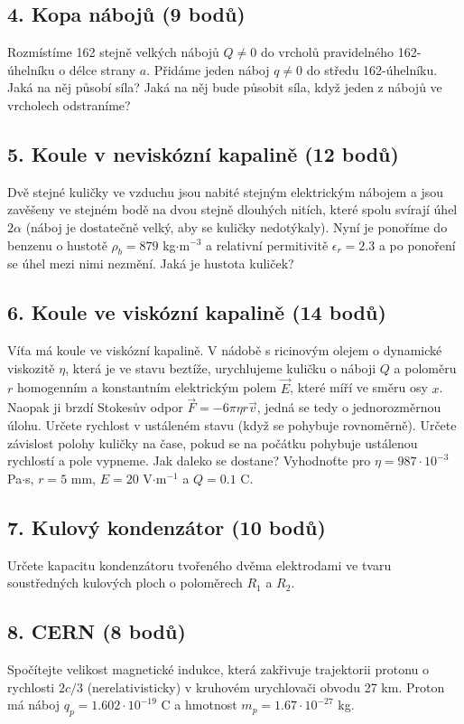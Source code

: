 \documentclass[12pt,a4paper]{article}
\begin{document}
\subsection*{4. Kopa nábojů (9 bodů)}
Rozmístíme 162 stejně velkých nábojů $Q\neq 0$ do vrcholů pravidelného 162-úhelníku o délce strany $a$. Přidáme jeden náboj $q\neq 0$ do středu 162-úhelníku. Jaká na něj působí síla? Jaká na něj bude působit síla, když jeden z nábojů ve vrcholech odstraníme?

\subsection*{5. Koule v neviskózní kapalině (12 bodů)}
Dvě stejné kuličky ve vzduchu jsou nabité stejným elektrickým nábojem a jsou zavěšeny ve stejném bodě na dvou stejně dlouhých nitích, které spolu svírají úhel $2\alpha$ (náboj je dostatečně velký, aby se kuličky nedotýkaly). Nyní je ponoříme do benzenu o hustotě $\rho_b = 879$ kg$\cdot$m$^{-3}$ a relativní permitivitě $\epsilon_r = 2.3$ a po ponoření se úhel mezi nimi nezmění. Jaká je hustota kuliček?

\subsection*{6. Koule ve viskózní kapalině (14 bodů)}
Víťa má koule ve viskózní kapalině. V nádobě s ricinovým olejem o dynamické viskozitě $\eta$, která je ve stavu beztíže, urychlujeme kuličku o náboji $Q$ a poloměru $r$ homogenním a konstantním elektrickým polem $\vec{E}$, které míří ve směru osy $x$. Naopak ji brzdí Stokesův odpor $\vec{F} = -6\pi\eta r\vec{v}$, jedná se tedy o jednorozměrnou úlohu. Určete rychlost v ustáleném stavu (když se pohybuje rovnoměrně). Určete závislost polohy kuličky na čase, pokud se na počátku pohybuje ustálenou rychlostí a pole vypneme. Jak daleko se dostane? Vyhodnoťte pro $\eta = 987\cdot 10^{-3}$ Pa$\cdot$s, $r = 5$ mm, $E = 20$ V$\cdot$m$^{-1}$ a $Q = 0.1$ C.

\subsection*{7. Kulový kondenzátor (10 bodů)}
Určete kapacitu kondenzátoru tvořeného dvěma elektrodami ve tvaru soustředných kulových ploch o poloměrech $R_1$ a $R_2$.

\subsection*{8. CERN (8 bodů)}
Spočítejte velikost magnetické indukce, která zakřivuje trajektorii protonu o rychlosti $2c/3$ (nerelativisticky) v kruhovém urychlovači obvodu 27 km. Proton má náboj $q_p = 1.602\cdot 10^{-19}$ C a hmotnost $m_p = 1.67\cdot 10^{-27}$ kg.
\end{document}
